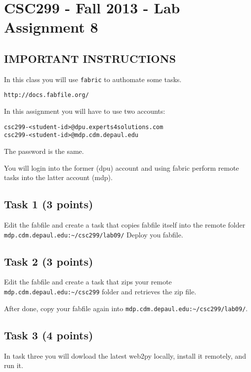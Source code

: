 \documentclass[12pt]{article}
\begin{document}
\section{CSC299 - Fall 2013 - Lab Assignment 8}

\subsection*{IMPORTANT INSTRUCTIONS}

\noindent In this class you will use {\tt fabric} to authomate some tasks.
\begin{verbatim}
http://docs.fabfile.org/
\end{verbatim}

\noindent In this assignment you will have to use two accounts:
\begin{verbatim}
csc299-<student-id>@dpu.experts4solutions.com
csc299-<student-id>@mdp.cdm.depaul.edu
\end{verbatim}
The password is the same.

You will login into the former (dpu) account and using fabric perform remote tasks into the latter account (mdp).

\subsection{Task 1 (3 points)}

Edit the fabfile and create a task that copies fabfile itself into the remote folder 
{\verb!mdp.cdm.depaul.edu:~/csc299/lab09/!}
Deploy you fabfile.

\subsection{Task 2 (3 points)}

Edit the fabfile and create a task that zips your remote {\verb!mdp.cdm.depaul.edu:~/csc299!} folder and retrieves the zip file.

After done, copy your fabfile again into {\verb!mdp.cdm.depaul.edu:~/csc299/lab09/!}.

\subsection{Task 3 (4 points)}

\noindent In task three you will dowload the latest web2py locally, install it remotely, and run it.
\end{document}
